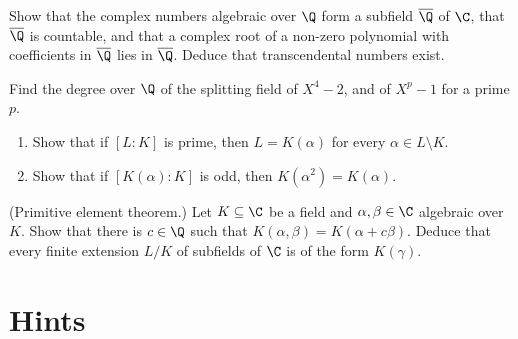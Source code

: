 \begin{exercise}[$\star\star$]\label{ex:algfield}
Show that the complex numbers algebraic over $\Q$ form a subfield $\overline{\Q}$ of $\C$, that $\overline{\Q}$ is countable, and that a complex root of a non-zero polynomial with coefficients in $\overline{\Q}$ lies in $\overline{\Q}$. Deduce that transcendental numbers exist.
\end{exercise}

\begin{exercise}[$\star\star$]\label{ex:splitdeg}
Find the degree over $\Q$ of the splitting field of $X^4-2$, and of $X^p-1$ for a prime $p$.
\end{exercise}

\begin{exercise}[$\star\star$]\label{ex:oddeg}
\begin{enumerate}[label=(\alph*)]
\item Show that if $[L:K]$ is prime, then $L=K(\alpha)$ for every $\alpha\in L\setminus K$.
\item Show that if $[K(\alpha):K]$ is odd, then $K(\alpha^2)=K(\alpha)$.
\end{enumerate}
\end{exercise}

\begin{exercise}[$\star\star\star$]\label{ex:primitive}
(Primitive element theorem.) Let $K\subseteq\C$ be a field and $\alpha,\beta\in\C$ algebraic over $K$. Show that there is $c\in\Q$ such that $K(\alpha,\beta)=K(\alpha+c\beta)$. Deduce that every finite extension $L/K$ of subfields of $\C$ is of the form $K(\gamma)$.
\end{exercise}

\section{Hints}

